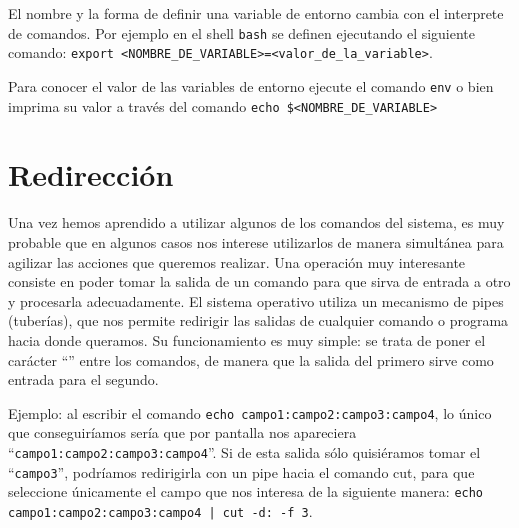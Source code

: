 \documentclass[12pt]{article}
\begin{document}
El nombre y la forma de definir una variable de entorno cambia con el interprete de comandos.
Por ejemplo en el shell \texttt{bash} se definen ejecutando el siguiente comando: \texttt{export \textless NOMBRE\_DE\_VARIABLE\textgreater=\textless valor\_de\_la\_variable\textgreater}.

Para conocer el valor de las variables de entorno ejecute el comando \texttt{env} o bien imprima su valor
a través del comando \texttt{echo \$\textless NOMBRE\_DE\_VARIABLE\textgreater}




\section{Redirección}

Una vez hemos aprendido a utilizar algunos de los comandos del sistema, es muy probable que en 
algunos casos nos interese utilizarlos de manera simultánea para agilizar las 
acciones que queremos realizar. Una operación muy interesante consiste en poder 
tomar la salida de un comando para que sirva de entrada a otro y procesarla adecuadamente. 
El sistema operativo utiliza un mecanismo de pipes (tuberías), que nos permite redirigir las salidas 
de cualquier comando o programa hacia donde queramos. Su funcionamiento es muy simple: se trata de poner el 
carácter ``\textbar'' entre los comandos, de manera que la salida del primero sirve como
 entrada para el segundo.

Ejemplo: al escribir el comando 
\texttt{echo campo1:campo2:campo3:campo4}, lo único que conseguiríamos sería que por 
pantalla nos apareciera ``\texttt{campo1:campo2:campo3:campo4}''. Si de esta salida sólo 
quisiéramos tomar el  ``\texttt{campo3}'', podríamos redirigirla con un pipe hacia el 
comando cut, para que seleccione únicamente el campo que nos interesa de la siguiente manera: 
\texttt{echo campo1:campo2:campo3:campo4 | cut -d: -f 3}. 
\end{document}
